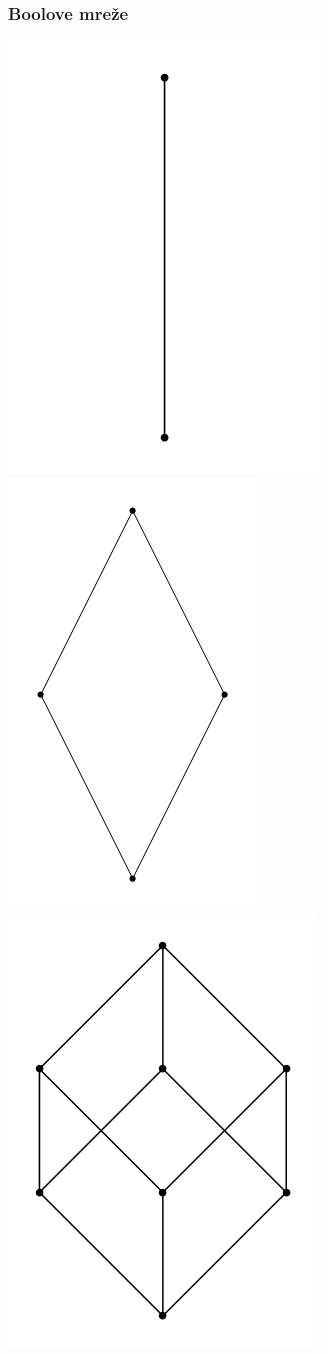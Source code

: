 \documentclass{beamer}
\begin{document}
\begin{frame}
\frametitle{Boolove mreže}
\includegraphics[scale=0.2]{bool1}
\includegraphics[scale=0.2]{bool2}
\includegraphics[scale=0.2]{bool3}

\end{frame}
\end{document}
